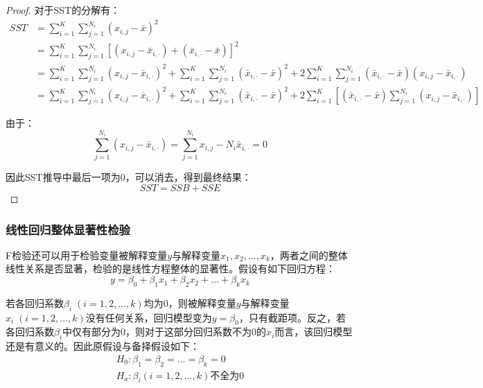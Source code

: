 \documentclass[11pt]{article}
\begin{document}
\begin{proof}
    对于SST的分解有：
    \begin{align*}
        SST &= \sum_{i=1}^{K}\sum_{j=1}^{N_i} (x_{i,j} - \bar{x})^2 \\
        &= \sum_{i=1}^{K}\sum_{j=1}^{N_i} \left[(x_{i,j} - \bar{x}_{i,\cdot}) + (\bar{x}_{i,\cdot} - \bar{x})\right]^2 \\
        &= \sum_{i=1}^{K}\sum_{j=1}^{N_i} (x_{i,j} - \bar{x}_{i,\cdot})^2 + \sum_{i=1}^{K}\sum_{j=1}^{N_i} (\bar{x}_{i,\cdot} - \bar{x})^2 + 2\sum_{i=1}^{K}\sum_{j=1}^{N_i} (\bar{x}_{i,\cdot} - \bar{x})(x_{i,j} - \bar{x}_{i,\cdot}) \\
        &= \sum_{i=1}^{K}\sum_{j=1}^{N_i} (x_{i,j} - \bar{x}_{i,\cdot})^2 + \sum_{i=1}^{K}\sum_{j=1}^{N_i} (\bar{x}_{i,\cdot} - \bar{x})^2 + 2\sum_{i=1}^{K} \left[ (\bar{x}_{i,\cdot} - \bar{x}) \sum_{j=1}^{N_i} (x_{i,j} - \bar{x}_{i,\cdot}) \right]
    \end{align*}

    由于：
    \begin{equation*}
        \sum_{j=1}^{N_i} (x_{i,j} - \bar{x}_{i,\cdot}) = \sum_{j=1}^{N_i} x_{i,j} - N_i \bar{x}_{i,\cdot} = 0
    \end{equation*}

    因此SST推导中最后一项为0，可以消去，得到最终结果：
    \begin{equation*}
        SST = SSB + SSE
    \end{equation*}
\end{proof}

\subsubsection{线性回归整体显著性检验}

F检验还可以用于检验变量被解释变量$y$与解释变量$x_1,x_2,\dots,x_k$，两者之间的整体线性关系是否显著，检验的是线性方程整体的显著性。假设有如下回归方程：
\begin{equation*}
    y = \beta_0 + \beta_1 x_1 + \beta_2 x_2 + \dots + \beta_k x_k
\end{equation*}

若各回归系数$\beta_i \;(i =1,2,\dots,k)$均为0，则被解释变量$y$与解释变量$x_i\;(i=1,2,\dots,k)$没有任何关系，回归模型变为$y=\beta_0$，只有截距项。反之，若各回归系数$\beta_i$中仅有部分为$0$，则对于这部分回归系数不为0的$x_i$而言，该回归模型还是有意义的。因此原假设与备择假设如下：
\begin{gather*}
    H_0: \beta_1 = \beta_2 = \dots = \beta_k = 0 \\
    H_a: \beta_i (i=1,2,\dots,k) \text{不全为0}
\end{gather*}
\end{document}
